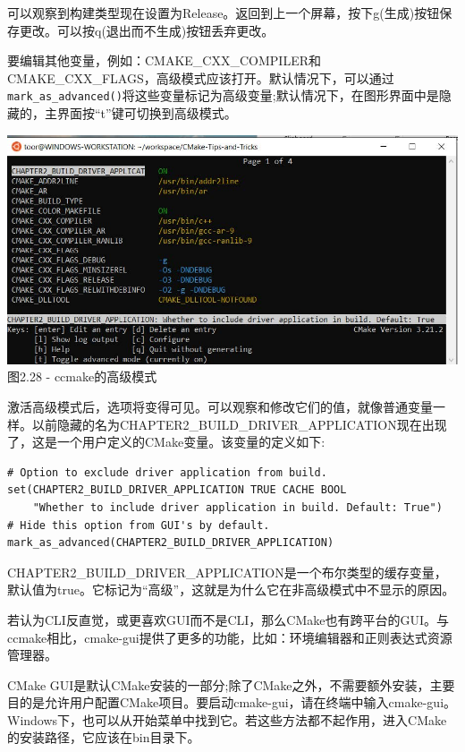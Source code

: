 可以观察到构建类型现在设置为Release。返回到上一个屏幕，按下g(生成)按钮保存更改。可以按q(退出而不生成)按钮丢弃更改。

要编辑其他变量，例如：CMAKE\_CXX\_COMPILER和CMAKE\_CXX\_FLAGS，高级模式应该打开。默认情况下，可以通过\texttt{mark\_as\_advanced()}将这些变量标记为高级变量;默认情况下，在图形界面中是隐藏的，主界面按“t”键可切换到高级模式。

\begin{center}
\includegraphics[width=1.\textwidth]{content/1/chapter2/images/28.jpg}\\
图2.28 - ccmake的高级模式
\end{center}

激活高级模式后，选项将变得可见。可以观察和修改它们的值，就像普通变量一样。以前隐藏的名为CHAPTER2\_BUILD\_DRIVER\_APPLICATION现在出现了，这是一个用户定义的CMake变量。该变量的定义如下:

\begin{lstlisting}[style=styleCMake]
# Option to exclude driver application from build.
set(CHAPTER2_BUILD_DRIVER_APPLICATION TRUE CACHE BOOL
	"Whether to include driver application in build. Default: True")
# Hide this option from GUI's by default.
mark_as_advanced(CHAPTER2_BUILD_DRIVER_APPLICATION)
\end{lstlisting}

CHAPTER2\_BUILD\_DRIVER\_APPLICATION是一个布尔类型的缓存变量，默认值为true。它标记为“高级”，这就是为什么它在非高级模式中不显示的原因。


若认为CLI反直觉，或更喜欢GUI而不是CLI，那么CMake也有跨平台的GUI。与ccmake相比，cmake-gui提供了更多的功能，比如：环境编辑器和正则表达式资源管理器。

CMake GUI是默认CMake安装的一部分;除了CMake之外，不需要额外安装，主要目的是允许用户配置CMake项目。要启动cmake-gui，请在终端中输入cmake-gui。Windows下，也可以从开始菜单中找到它。若这些方法都不起作用，进入CMake的安装路径，它应该在bin目录下。

